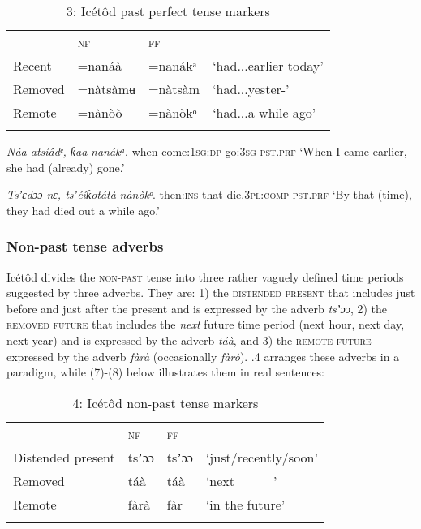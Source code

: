 \begin{table}
\caption{3: Icétôd past perfect tense markers}
\label{tab:9}


\begin{tabularx}{\textwidth}{XXXX} & \textsc{nf} & \textsc{ff} & \\
\lsptoprule
Recent & =nanáà & =nanákᵃ & ‘had...earlier today’\\
Removed & =nàtsàmʉ & =nàtsàm & ‘had...yester-’\\
Remote & =nànòò & =nànòkᵒ & ‘had...a while ago’\\
\lspbottomrule
\end{tabularx}
\end{table}



\textit{Náa   atsíâdᵉ,     ƙaa}     \textit{nanákᵃ}.
when  come:\textsc{1sg:dp}   go:\textsc{3sg}   \textsc{pst.prf}
‘When I came earlier, she had (already) gone.’




\textit{Tsʼɛdɔɔ   nɛ,   tsʼéíƙotátà}     \textit{nànòkᵒ}.
then:\textsc{ins}   that   die.\textsc{3pl:comp}   \textsc{pst.prf}
‘By that (time), they had died out a while ago.’




\subsubsection{Non-past tense adverbs}

Icétôd divides the \textsc{non-past} tense into three rather vaguely defined time periods suggested by three adverbs. They are: 1) the \textsc{distended} \textsc{present} that includes just before and just after the present and is expressed by the adverb \textit{tsʼɔɔ}, 2) the \textsc{removed future} that includes the \textit{next} future time period (next hour, next day, next year) and is expressed by the adverb \textit{táà}, and 3) the \textsc{remote future} expressed by the adverb \textit{fàrà} (occasionally \textit{fàrò}). .4 arranges these adverbs in a paradigm, while (7)-(8) below illustrates them in real sentences:


\begin{table}
\caption{4: Icétôd non-past tense markers}
\label{tab:9}


\begin{tabularx}{\textwidth}{XXXX} & \textsc{nf} & \textsc{ff} & \\
\lsptoprule
Distended present & tsʼɔɔ & tsʼɔɔ & ‘just/recently/soon’\\
Removed & táà & táà & ‘next\_\_\_\_’\\
Remote & fàrà & fàr & ‘in the future’\\
\lspbottomrule
\end{tabularx}
\end{table}



